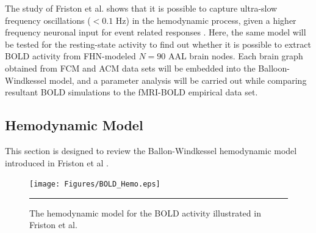 The study of Friston et al. shows that it is possible to capture ultra-slow frequency oscillations ($<0.1$ Hz) in the hemodynamic process, given a higher frequency neuronal input for event related responses \citep{FRI00}. Here, the same model will be tested for the resting-state activity to find out whether it is possible to extract BOLD activity from FHN-modeled $N=90$ AAL brain nodes. Each brain graph obtained from FCM and ACM data sets will be embedded into the Balloon-Windkessel model, and a parameter analysis will be carried out while comparing resultant BOLD simulations to the fMRI-BOLD empirical data set.

  

\subsection{Hemodynamic Model}

This section is designed to review the Ballon-Windkessel hemodynamic model introduced in Friston et al \citep{FRI00}.  


\begin{figure}[htbp]
  \centering
	\texttt{[image: Figures/BOLD\_Hemo.eps]}
 	\rule{35em}{0.5pt}
    \caption[Hemodynamic Model]{The hemodynamic model for the BOLD activity illustrated in Friston et al. \citep{FRI00}  }
  \label{fig:Hemodynamic Model}	
\end{figure}


